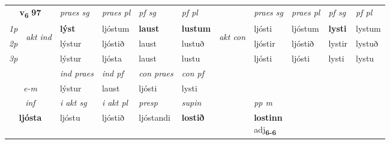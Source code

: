 \noindent
\begin{tabular}{lllllllllll} \toprule
\multicolumn{2}{c}{\textbf{v{\textsubscript{6}}} \Large{\textbf{97}}}  &  \textit{praes sg}  & \textit{praes pl}  &\textit{ pf sg} & \textit{pf pl} &  &  \textit{praes sg}  & \textit{praes pl}  & \textit{pf sg} & \textit{pf pl } \\*
	\cmidrule{3-6} \cmidrule{8-11}
 {\textit{1p}} & \multirow{3}{*}{\begin{turn}{90}\textit{akt ind}\end{turn}} & \textbf{lýst} & ljóstum & \textbf{laust} & \textbf{lustum} & \multirow{3}{*}{\begin{turn}{90}\textit{akt con}\end{turn}} &ljósti & ljóstum & \textbf{lysti} & lystum\\*
 {\textit{2p}} &  &  lýstur  & ljóstið & laust & lustuð & & ljóstir & ljóstið & lystir & lystuð \\*
{\textit{3p}} &  & lýstur & ljósta & laust & lustu & & ljósti & ljósti& lysti & lystu \\*
\cmidrule{3-6} \cmidrule{8-11}

   & &  \textit{ind praes} & \textit{ind pf} & \textit{con praes} & \textit{con pf} \\*
\multicolumn{2}{c}{ \textit{e-m} } & lýstur & laust & ljósti & lysti \\*

\cmidrule{3-8}
   \multicolumn{2}{c}{\textit{inf}}  & \textit{i akt sg} & \textit{i akt pl}   & \textit{presp} & \textit{supin}  && \textit{pp m} \\*
  \multicolumn{2}{c}{\textbf{ljósta}} & ljóstu  & ljóstið   & ljóstandi &  \textbf{lostið}  && \specialcell{\textbf{lostinn} \\ adj\textbf{\textsubscript{6-6}}} \\*
\end{tabular}

